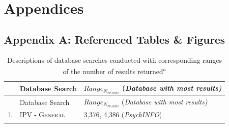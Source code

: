 \documentclass[11pt,]{tufte-book}
\begin{document}
\part{Appendices}

\chapter{Appendix A: Referenced Tables \&
Figures}\label{appendix-a-referenced-tables-figures}

\begin{longtable}[]{@{}lll@{}}
\caption{Descriptions of database searches conducted with corresponding
ranges of the number of results returned\textsuperscript{a}
\label{tbl:dbsrch}}\tabularnewline
\toprule
\begin{minipage}[b]{0.03\columnwidth}\raggedright\strut
\strut
\end{minipage} & \begin{minipage}[b]{0.44\columnwidth}\raggedright\strut
Database Search\strut
\end{minipage} & \begin{minipage}[b]{0.45\columnwidth}\raggedright\strut
\footnotesize{$Range_{N_{Results}}$}
(\textit{\scriptsize{Database with most results})}\strut
\end{minipage}\tabularnewline
\midrule
\endfirsthead
\toprule
\begin{minipage}[b]{0.03\columnwidth}\raggedright\strut
\strut
\end{minipage} & \begin{minipage}[b]{0.44\columnwidth}\raggedright\strut
Database Search\strut
\end{minipage} & \begin{minipage}[b]{0.45\columnwidth}\raggedright\strut
\footnotesize{$Range_{N_{Results}}$}
(\textit{\scriptsize{Database with most results})}\strut
\end{minipage}\tabularnewline
\midrule
\endhead
\begin{minipage}[t]{0.03\columnwidth}\raggedright\strut
1.\strut
\end{minipage} & \begin{minipage}[t]{0.44\columnwidth}\raggedright\strut
\textsc{IPV - General}\strut
\end{minipage} & \begin{minipage}[t]{0.45\columnwidth}\raggedright\strut
3,376, 4,386 (\textit{PsychINFO})\strut
\end{minipage}\tabularnewline
\begin{minipage}[t]{0.03\columnwidth}\raggedright\strut

\end{minipage}
\end{longtable}
\end{document}
